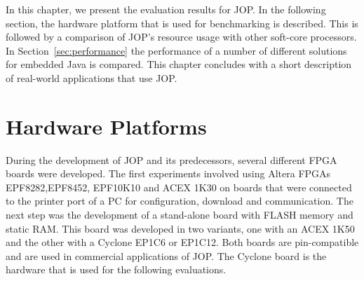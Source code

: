 
In this chapter, we present the evaluation results for JOP. In the
following section, the hardware platform that is used for
benchmarking is described. This is followed by a comparison of JOP's
resource usage with other soft-core processors. In
Section~\ref{sec:performance} the performance of a number of
different solutions for embedded Java is compared. This chapter
concludes with a short description of real-world applications that
use JOP.

\section{Hardware Platforms}

During the development of JOP and its predecessors, several
different FPGA boards were developed. The first experiments involved
using Altera FPGAs EPF8282,\linebreak[4] EPF8452, EPF10K10 and ACEX
1K30 on boards that were connected to the printer port of a PC for
configuration, download and communication. The next step was the
development of a stand-alone board with FLASH memory and static RAM.
This board was developed in two variants, one with an ACEX 1K50 and
the other with a Cyclone EP1C6 or EP1C12. Both boards are
pin-compatible and are used in commercial applications of JOP. The
Cyclone board is the hardware that is used for the following
evaluations.


